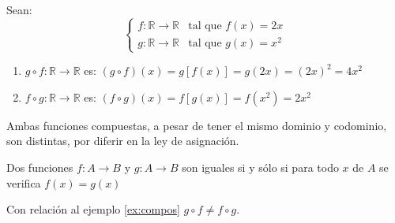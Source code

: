 \begin{fmd-example} \label{ex:compos}
	Sean: \[ \begin{cases}
		f: \mathbb{R} \rightarrow \mathbb{R} & \mbox{tal que } f(x) = 2x \\
		g: \mathbb{R} \rightarrow \mathbb{R} & \mbox{tal que } g(x) = x^2
	\end{cases}
	\]
	\begin{enumerate}
		\item $g \circ f: \mathbb{R} \rightarrow \mathbb{R}$ es:
		$ (g \circ f)(x) = g\left[ f(x) \right] = g(2x) = (2x)^2 = 4x^2$
		\item $f \circ g: \mathbb{R} \rightarrow \mathbb{R}$ es:
		$ \left( f \circ g \right)(x) = f\left[g(x)\right] = f(x^2) = 2 x^2 $
	\end{enumerate}
	Ambas funciones compuestas, a pesar de tener el mismo dominio y codominio, son
	distintas, por diferir en la ley de asignación.
\end{fmd-example}

\begin{definition} 
	Dos funciones $f:A \rightarrow B$ y $g: A \rightarrow B$ son iguales si y sólo si
	para todo $x$ de $A$ se verifica $f(x) = g(x)$
\end{definition}\vspace{2mm}
Con relación al ejemplo \ref{ex:compos} $g \circ f \ne f \circ g$.

